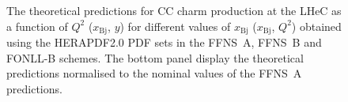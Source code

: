 \documentclass[pdftex,twocolumn,epjc3]{svjour3}          %
\newcommand{\xbj}{\ensuremath{x_{\text{Bj}}}\xspace}
\newcommand{\fonll} {{FONLL-B}\xspace}
\newcommand{\ffns} {{FFNS~A}\xspace}
\newcommand{\ffnsb} {{FFNS~B}\xspace}
\begin{document}
\begin{figure}
    \centering
    \caption{The theoretical predictions for CC charm production at
      the LHeC as a function of $Q^2$ ($\xbj$, $y$) for different
      values of $\xbj$ ($\xbj$, $Q^2$) obtained using the HERAPDF2.0
      PDF sets in the \ffns, \ffnsb and \fonll schemes. The bottom
      panel display the theoretical predictions normalised to the
      nominal values of the \ffns predictions.}
    \label{fig:thpred-ff3abfonll}
\end{figure}
\end{document}
